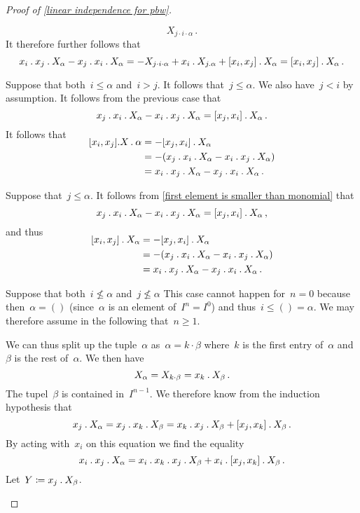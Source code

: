 \begin{proof}[Proof of \cref{linear independence for pbw}]
\begin{casedistinction}
\begin{casedistinction}
\[						X_{j \cdot i \cdot \alpha} \,.
					\]
					It therefore further follows that
					\[
						x_i \mathbin{.} x_j \mathbin{.} X_\alpha - x_j \mathbin{.} x_i \mathbin{.} X_\alpha
						=
						- X_{j \cdot i \cdot \alpha}
						+ x_i \mathbin{.} X_{j \mathbin{.} \alpha}
						+ [x_i, x_j] \mathbin{.} X_\alpha
						=
						[x_i, x_j] \mathbin{.} X_\alpha \,.
					\]
				\item
					Suppose that both~$i \leq \alpha$ and~$i > j$.
					It follows that~$j \leq \alpha$.
					We also have~$j < i$ by assumption.
					It follows from the previous case that
					\[
						x_j \mathbin{.} x_i \mathbin{.} X_\alpha - x_i \mathbin{.} x_j \mathbin{.} X_\alpha
						=
						[x_j, x_i] \mathbin{.} X_\alpha \,.
					\]
					It follows that
					\begin{align*}
						\SwapAboveDisplaySkip
						[x_i, x_j].X \act \alpha
						&=
						-[x_j, x_i] \act X_\alpha
						\\
						&=
						- (x_j \act x_i \act X_\alpha - x_i \act x_j \act X_\alpha)
						\\
						&=
						x_i \act x_j \act X_\alpha - x_j \act x_i \act X_\alpha \,.
					\end{align*}
			\end{casedistinction}
		\item
			\label{second element is smaller than monomial}
			Suppose that~$j \leq \alpha$.
			It follows from \cref{first element is smaller than monomial} that
			\[
				x_j \mathbin{.} x_i \mathbin{.} X_\alpha - x_i \mathbin{.} x_j \mathbin{.} X_\alpha
				=
				[x_j, x_i] \mathbin{.} X_\alpha \,,
			\]
			and thus
			\begin{align*}
				\SwapAboveDisplaySkip
				[x_i, x_j] \act X_\alpha
				&=
				-[x_j, x_i] \act X_\alpha
				\\
				&=
				- (x_j \act x_i \act X_\alpha - x_i \act x_j \act X_\alpha)
				\\
				&=
				x_i \act x_j \act X_\alpha - x_j \act x_i \act X_\alpha \,.
			\end{align*}
		\item
			Suppose that both~$i \nleq \alpha$ and~$j \nleq \alpha$
			This case cannot happen for~$n = 0$ because then~$\alpha = ()$ (since~$\alpha$ is an element of~$I^n = I^0$) and thus~$i \leq () = \alpha$.
			We may therefore assume in the following that~$n \geq 1$.

			We can thus split up the tuple~$\alpha$ as~$\alpha = k \cdot \beta$ where~$k$ is the first entry of~$\alpha$ and~$\beta$ is the rest of~$\alpha$.
			We then have
			\[
				X_\alpha
				=
				X_{k \cdot \beta}
				=
				x_k \mathbin{.} X_\beta \,.
			\]
			The tupel~$\beta$ is contained in~$I^{n-1}$.
			We therefore know from the induction hypothesis that
			\[
				x_j \mathbin{.} X_\alpha
				=
				x_j \mathbin{.} x_k \mathbin{.} X_\beta
				=
				x_k \mathbin{.} x_j \mathbin{.} X_\beta 
				+ [x_j, x_k] \mathbin{.} X_\beta  \,.
			\]
			By acting with~$x_i$ on this equation we find the equality
			\begin{equation}
				\label{long equation}
				x_i \mathbin{.} x_j \mathbin{.} X_\alpha
				=
				x_i \mathbin{.} x_k \mathbin{.} x_j \mathbin{.} X_\beta
				+ x_i \mathbin{.} [x_j,x_k] \mathbin{.} X_\beta \,.
			\end{equation}
			Let~$Y \coloneqq x_j \mathbin{.} X_\beta$.


\end{casedistinction}
\end{proof}
